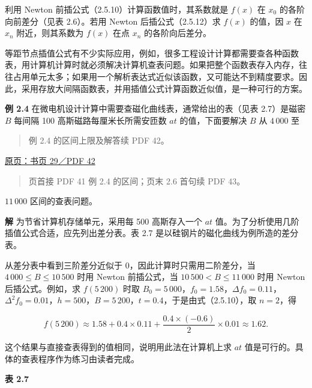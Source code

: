 \documentclass[
  10pt,
  fontset=fandol]{ctexart}
\begin{document}
利用 Newton 前插公式（2.5.10）计算函数值时，其系数就是 \(f(x)\) 在 \(x_0\) 的各阶向前差分（见表 2.6）。若用 Newton 后插公式（2.5.12）求 \(f(x)\) 的值，因 \(x\) 在 \(x_n\) 附近，则其系数为 \(f(x)\) 在点 \(x_n\) 的各阶向后差分。

等距节点插值公式有不少实际应用，例如，很多工程设计计算都需要查各种函数表，用计算机计算时就必须解决计算机查表问题。如果把整个函数表存入内存，往往占用单元太多；如果用一个解析表达式近似该函数，又可能达不到精度要求。因此，采用存放大间隔函数表，并用插值公式计算函数近似值，是一种可行的方案。

\textbf{例 2.4} 在微电机设计计算中需要查磁化曲线表，通常给出的表（见表 2.7）是磁密 \(B\) 每间隔 100 高斯磁路每厘米长所需安匝数 \(at\) 的值，下面要解决 \(B\) 从 \(4\,000\) 至

\begin{quote}
例 2.4 的区间上限及解答续 PDF 42。
\end{quote}

\href{../../source-images/pdf-042.jpeg}{原页：书页 29／PDF 42}

\begin{quote}
页首接 PDF 41 例 2.4 的区间；页末 2.6 首句续 PDF 43。
\end{quote}

\(11\,000\) 区间的查表问题。

\textbf{解} 为节省计算机存储单元，采用每 500 高斯存入一个 \(at\) 值。为了分析使用几阶插值公式合适，应先列出差分表。表 2.7 是以硅钢片的磁化曲线为例所造的差分表。

从差分表中看到三阶差分近似于 0，因此计算时只需用二阶差分，当 \(4\,000\le B\le10\,500\) 时用 Newton 前插公式，当 \(10\,500<B\le11\,000\) 时用 Newton 后插公式。例如，求 \(f(5\,200)\) 时取 \(B_0=5\,000\)，\(f_0=1.58\)，\(\Delta f_0=0.11\)，\(\Delta^2 f_0=0.01\)，\(h=500\)，\(B=5\,200\)，\(t=0.4\)，于是由式（2.5.10），取 \(n=2\)，得

\[
f(5\,200)\approx1.58+0.4\times0.11+\frac{0.4\times(-0.6)}{2}\times0.01\approx1.62.
\]

这个结果与直接查表得到的值相同，说明用此法在计算机上求 \(at\) 值是可行的。具体的查表程序作为练习由读者完成。

\textbf{表 2.7}
\end{document}
